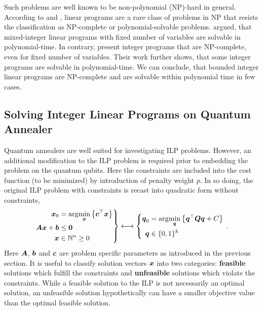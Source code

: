 \documentclass[utf8, nocrop]{FrontiersinHarvardArxiv}
\def\N{\mathbb{N}}
\def\ve#1{\mathlette{\boldmath}{#1}}
\def\mathlette#1#2{{\mathchoice{\mbox{#1$\displaystyle #2$}}%
        {\mbox{#1$\textstyle #2$}}%
        {\mbox{#1$\scriptstyle #2$}}%
        {\mbox{#1$\scriptscriptstyle #2$}}}}
\def\argmin#1{\mathrm{arg}\underset{#1}{\mathrm{min}}}
\begin{document}
Such problems are well known to be non-polynomial (NP)-hard in general. According to \cite{complexity_ilp} and \cite{Karp1972}, linear programs are a rare class of problems in NP that resists the classification as NP-complete or polynomial-solvable problems. \cite{Lenstra} argued, that mixed-integer linear programs with fixed number of variables are solvable in polynomial-time. In contrary, \cite{nguyen2017computational} present integer programs that are NP-complete, even for fixed number of variables. Their work further shows, that some integer programs are solvable in polynomial-time. We can conclude, that bounded integer linear programs are NP-complete and are solvable within polynomial time in few cases. 

\subsection{Solving Integer Linear Programs on Quantum Annealer}
\label{sec:ilp_qa_qubo}

Quantum annealers are well suited for investigating ILP problems.  However, an additional modification to the ILP problem is required prior to embedding the problem on the quantum qubits.  Here the constraints are included into the cost function (to be minimized) by introduction of penalty weight $p$.  In so doing, the original ILP problem with constraints is recast into quadratic form without constraints,
\begin{equation}
    \left.
    \begin{aligned}
        \ve{x}_0
        &=
        \argmin{\ve{x}}\left\{\ve{c}^\top \ve{x} \right\}\\
        \ve A \ve{x}+\ve{b}
        &
        \leq \ve{0}
        \\
        \ve{x}
        &\in\N^n \geq 0
    \end{aligned}
    \right\}
    \longleftrightarrow
    \left\{
    \begin{aligned}
        \ve{q}_0 &= \argmin{\ve q}\left\{\ve{q}^\top \ve Q \ve q + C \right\}\\
        \ve q&\in \{0, 1\}^k
    \end{aligned}
    \right.
    \,.
\end{equation}
Here $\ve A$, $\ve b$ and $\ve c$ are problem specific parameters as introduced in the previous section.
It is useful to classify solution vectors $\ve{x}$ into two categories: \textbf{feasible} solutions which fulfill the constraints and \textbf{unfeasible} solutions which violate the constraints.
While a feasible solution to the ILP is not necessarily an optimal solution, an unfeasible solution hypothetically can have a smaller objective value than the optimal feasible solution.
\end{document}
